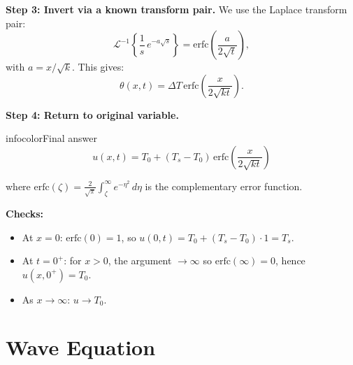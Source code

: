 \documentclass[a4paper,11pt]{article} %
\newenvironment{summarybox}[1][]{\begin{custombox}[#1]{infocolor}{Final answer}}{\end{custombox}}
\begin{document}
\textbf{Step 3: Invert via a known transform pair.}
We use the Laplace transform pair:
\[
    \mathcal{L}^{-1}\!\left\{\frac{1}{s}\,e^{-a\sqrt{s}}\right\} = \mathrm{erfc}\!\left(\frac{a}{2\sqrt{t}}\right),
\]
with $a = x/\sqrt{k}$. This gives:
\[
    \theta(x,t) = \Delta T\,\mathrm{erfc}\!\left(\frac{x}{2\sqrt{kt}}\right).
\]

\textbf{Step 4: Return to original variable.}

\begin{summarybox}
$$u(x,t) = T_0 + (T_s - T_0)\,\mathrm{erfc}\!\left(\frac{x}{2\sqrt{kt}}\right)$$
\end{summarybox}

where $\mathrm{erfc}(\zeta) = \frac{2}{\sqrt{\pi}}\int_\zeta^\infty e^{-\eta^2}\,d\eta$ is the complementary error function.

\textbf{Checks:}
\begin{itemize}
    \item At $x=0$: $\mathrm{erfc}(0) = 1$, so $u(0,t) = T_0 + (T_s-T_0)\cdot 1 = T_s$. \checkmark
    \item At $t=0^+$: for $x>0$, the argument $\to\infty$ so $\mathrm{erfc}(\infty)=0$, hence $u(x,0^+)=T_0$. \checkmark
    \item As $x\to\infty$: $u \to T_0$. \checkmark
\end{itemize}

\newpage
\section{Wave Equation}
\end{document}
